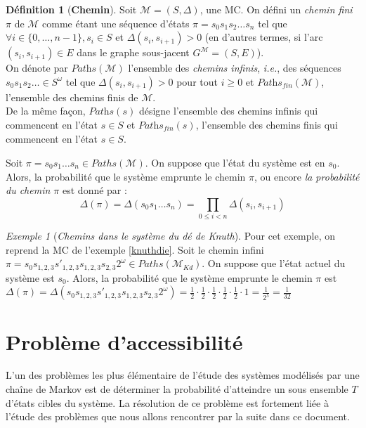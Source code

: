 \documentclass[12pt,a4paper]{report}
\theoremstyle{definition}%
\newtheorem{definition}{Définition}[chapter]
\theoremstyle{remark}
\newtheorem{example}{Exemple}[chapter]
\newcommand{\ie}{\textit{i.e.}, }
\begin{document}
\begin{definition}[\textbf{Chemin}]
	Soit $\mathcal{M} = (S, \Delta)$, une MC. On défini un \textit{chemin fini} $\pi$ de $\mathcal{M}$ comme étant une séquence d'états $\pi = s_0 s_1 s_2 \dots s_n$ tel que $\forall i \in \{0, \dots, n-1\}, s_i \in S$ et $\Delta(s_i, s_{i+1}) > 0$ (en d'autres termes, si l'arc $(s_i, s_{i+1}) \in E$ dans le graphe sous-jacent $G^\mathcal{M} = (S, E)$).
	\\
	On dénote par $\textit{Paths}(\mathcal{M})$ l'ensemble des \textit{chemins infinis}, \ie des séquences $s_0 s_1 s_2 \dots \in S^\omega$ tel que $\Delta(s_i, s_{i+1}) > 0$ pour tout $i \geq 0$ et $\textit{Paths}_\textit{fin}(\mathcal{M})$, l'ensemble des chemins finis de $\mathcal{M}$.\\
	De la même façon, $\textit{Paths}(s)$ désigne l'ensemble des chemins infinis qui commencent en l'état $s \in S$ et $\textit{Paths}_\textit{fin}(s)$, l'ensemble des chemins finis qui commencent en l'état $s \in S$.
\end{definition}

Soit $\pi = s_0 s_1 \dots s_n \in Paths(\mathcal{M})$. On suppose que l'état du système est en $s_0$.
Alors, la probabilité que le système emprunte le chemin $\pi$, ou encore \textit{la probabilité du chemin $\pi$} est donné par : 
\[ \Delta(\pi) = \Delta(s_0 s_1 \dots s_n) = \prod_{0 \leq i < n} \Delta(s_i, s_{i+1}) \]

\begin{example}[\textit{Chemins dans le système du dé de Knuth}]
	Pour cet exemple, on reprend la MC de l'exemple \ref{knuthdie}. Soit le chemin infini $\pi = s_0 s_{1,2,3} s'_{1, 2, 3} s_{1,2,3} s_{2,3} 2^\omega \in Paths(\mathcal{M}_{Kd})$.
	On suppose que l'état actuel du système est $s_0$. Alors, la probabilité que le système emprunte le chemin $\pi$ est $\Delta(\pi) = \Delta(s_0 s_{1,2,3} s'_{1, 2, 3} s_{1,2,3} s_{2,3} 2^\omega) = \frac{1}{2} \cdot \frac{1}{2} \cdot \frac{1}{2} \cdot \frac{1}{2} \cdot \frac{1}{2} \cdot 1 = \frac{1}{2^5} = \frac{1}{32}$
\end{example}

\section{Problème d'accessibilité}

L'un des problèmes les plus élémentaire de l'étude des systèmes modélisés par une chaîne de Markov est de déterminer la probabilité d'atteindre un sous ensemble $T$ d'états cibles du système. La résolution de ce problème est fortement liée à l'étude des problèmes que nous allons rencontrer par la suite dans ce document.
\end{document}
